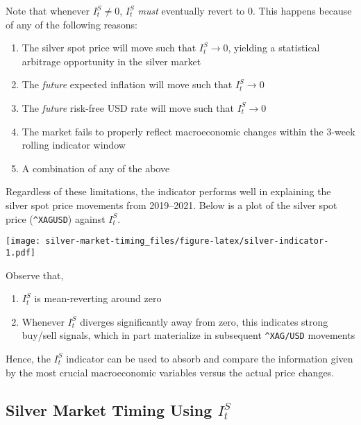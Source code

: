 \documentclass[
  12pt,
]{article}
\providecommand{\tightlist}{%
  \setlength{\itemsep}{0pt}\setlength{\parskip}{0pt}}
\begin{document}
Note that whenever \(I^S_t \neq 0\), \(I^S_t\) \emph{must} eventually
revert to \(0\). This happens because of any of the following reasons:

\begin{enumerate}
\def\labelenumi{\alph{enumi}.}
\tightlist
\item
  The silver spot price will move such that \(I^S_t \to 0\), yielding a
  statistical arbitrage opportunity in the silver market
\item
  The \emph{future} expected inflation will move such that
  \(I^S_t \to 0\)
\item
  The \emph{future} risk-free USD rate will move such that
  \(I^S_t \to 0\)
\item
  The market fails to properly reflect macroeconomic changes within the
  3-week rolling indicator window
\item
  A combination of any of the above
\end{enumerate}

Regardless of these limitations, the indicator performs well in
explaining the silver spot price movements from 2019--2021. Below is a
plot of the silver spot price (\texttt{\^{}XAGUSD}) against \(I^S_t\).

\texttt{[image: silver-market-timing\_files/figure-latex/silver-indicator-1.pdf]}

Observe that,

\begin{enumerate}
\def\labelenumi{\arabic{enumi}.}
\tightlist
\item
  \(I^S_t\) is mean-reverting around zero
\item
  Whenever \(I^S_t\) diverges significantly away from zero, this
  indicates strong buy/sell signals, which in part materialize in
  subsequent \texttt{\^{}XAG/USD} movements
\end{enumerate}

Hence, the \(I^S_t\) indicator can be used to absorb and compare the
information given by the most crucial macroeconomic variables versus the
actual price changes.

\newpage

\hypertarget{silver-market-timing-using-is_t}{%
\subsection{\texorpdfstring{Silver Market Timing Using
\(I^S_t\)}{Silver Market Timing Using I\^{}S\_t}}\label{silver-market-timing-using-is_t}}
\end{document}
